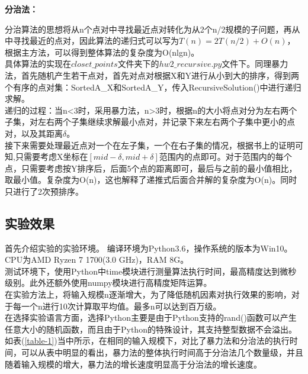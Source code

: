 \documentclass[UTF8]{ctexart}
\begin{document}
\textbf{分治法：}

分治算法的思想将从n个点对中寻找最近点对转化为从2个n/2规模的子问题，再从中寻找最近的点对，因此算法的递归式可以写为$T(n)=2T(n/2)+O(n)$，根据主方法，可以得到整体算法的复杂度为O(nlgn)。\\

具体算法的实现在$closet\_points$文件夹下的$hw2\_recursive.py$文件下。同理暴力法，首先随机产生若干点对，首先对点对根据X和Y进行从小到大的排序，得到两个有序的点对集：SortedA\_X和SortedA\_Y，传入RecursiveSolution()中进行递归求解。\\
递归的过程：当n<3时，采用暴力法，n>3时，根据n的大小将点对分为左右两个子集，对左右两个子集继续求解最小点对，并记录下来左右两个子集中更小的点对，以及其距离$\delta$。\\
接下来需要处理最近点对一个在左子集，一个在右子集的情况，根据书上的证明可知,只需要考虑X坐标在$[mid-\delta, mid+\delta]$范围内的点即可。对于范围内的每个点，只需要考虑按Y排序后，后面5个点的距离即可，最后与之前的最小值相比，取最小值。复杂度为O(n)，这也解释了递推式后面合并解的复杂度为O(n)。同时只进行了2次预排序。


\subsection{实验效果}

首先介绍实验的实验环境。
编译环境为Python3.6，操作系统的版本为Win10。
CPU为AMD Ryzen 7 1700(3.0 GHz)，RAM 8G。\\
测试环境下，使用Python中time模块进行测量算法执行时间，最高精度达到微秒级别。此外还额外使用numpy模块进行高精度矩阵运算。\\
在实验方法上，将输入规模n逐渐增大，为了降低随机因素对执行效果的影响，对于每一个n进行10次计算取平均值。最多n可以达到百万级。\\
在选择实验语言方面，选择Python主要是由于Python支持的rand()函数可以产生任意大小的随机函数，而且由于Python的特殊设计，其支持整型数据不会溢出。\\

如表(\ref{table-1})当中所示，在相同的输入规模下，对比了暴力法和分治法的执行时间，可以从表中明显的看出，暴力法的整体执行时间高于分治法几个数量级，并且随着输入规模的增大，暴力法的增长速度明显高于分治法的增长速度。
\end{document}
